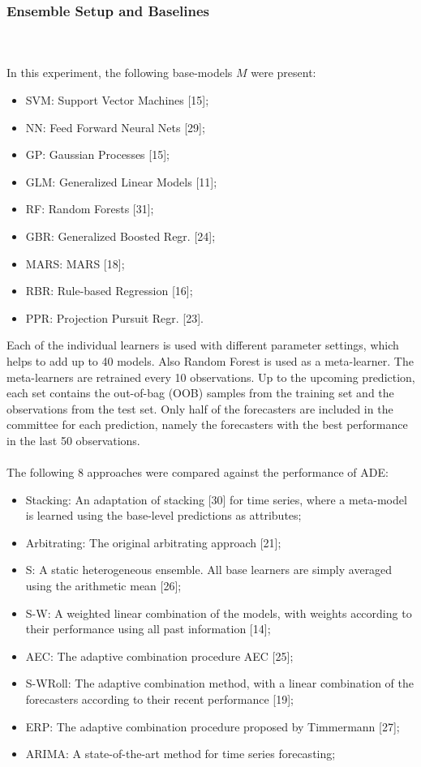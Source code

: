 \documentclass[runningheads,a4paper]{llncs}[2015/06/24]
\begin{document}
\subsubsection{Ensemble Setup and Baselines}
\hspace{1cm}\\\\ In this experiment, the following base-models $M$ were present:
\begin{itemize}
\item SVM: Support Vector Machines [15];
\item NN: Feed Forward Neural Nets [29];
\item GP: Gaussian Processes [15];
\item GLM: Generalized Linear Models [11];
\item RF: Random Forests [31];
\item GBR: Generalized Boosted Regr. [24];
\item MARS: MARS [18];
\item RBR: Rule-based Regression [16];
\item PPR: Projection Pursuit Regr. [23].
\end{itemize}
Each of the individual learners is used with different parameter settings, which helps to add up to 40 models. Also Random Forest is used as a meta-learner. The meta-learners are retrained every 10 observations. Up to the upcoming prediction, each set contains the out-of-bag (OOB) samples from the training set and the observations from the test set. Only half of the forecasters are included in the committee for each prediction, namely the forecasters with the best performance in the last 50 observations. \\\\ The following 8 approaches were compared against the performance of ADE: 
\begin{itemize}
\item Stacking: An adaptation of stacking [30] for time series, where a meta-model is learned using the base-level predictions as attributes; 
\item Arbitrating: The original arbitrating approach [21];
\item S: A static heterogeneous ensemble. All base learners are simply averaged using the arithmetic mean [26];
\item S-W: A weighted linear combination of the models, with weights according to their performance using all past information [14];
\item AEC: The adaptive combination procedure AEC [25];
\item S-WRoll: The adaptive combination method, with a linear combination of the forecasters according to their recent performance [19];
\item ERP: The adaptive combination procedure proposed by Timmermann [27];
\item ARIMA: A state-of-the-art method for time series forecasting;
\end{itemize}
\end{document}
